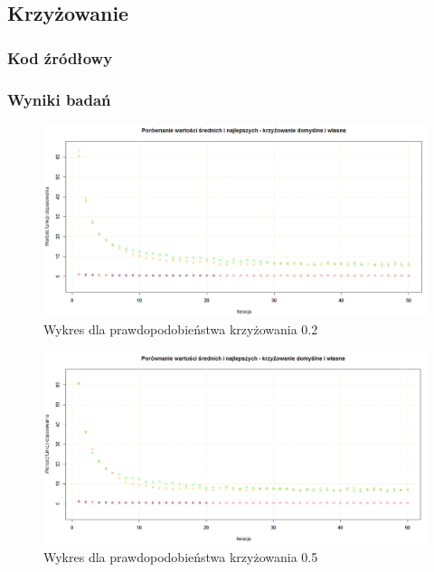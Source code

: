 \subsection{Krzyżowanie}

\subsubsection{Kod źródłowy}



\subsubsection{Wyniki badań}

\begin{figure}[H]
	\centering
	\hspace*{-0.8in}
	\includegraphics[scale = 0.5]{img/zad1/cross_0_2}
	\caption{Wykres dla prawdopodobieństwa krzyżowania 0.2}  
	\label{rys:cross_0_2} 
\end{figure}


\begin{figure}[H]
	\centering
	\hspace*{-0.8in}
	\includegraphics[scale = 0.5]{img/zad1/cross_0_5}
	\caption{Wykres dla prawdopodobieństwa krzyżowania 0.5}  
	\label{rys:cross_0_5} 
\end{figure}


